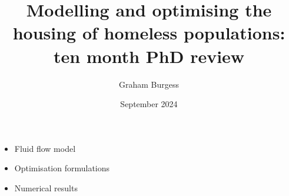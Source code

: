 \message{ !name(TenMonthReview.tex)}\documentclass{article}
\title{Modelling and optimising the housing of homeless populations: ten month PhD review}
\author{Graham Burgess}
\date{September 2024}
\begin{document}
 \label{do}

\begin{itemize}[noitemsep]
\item Fluid flow model
\item Optimisation formulations
\item Numerical results
\end{itemize}


\end{document}
